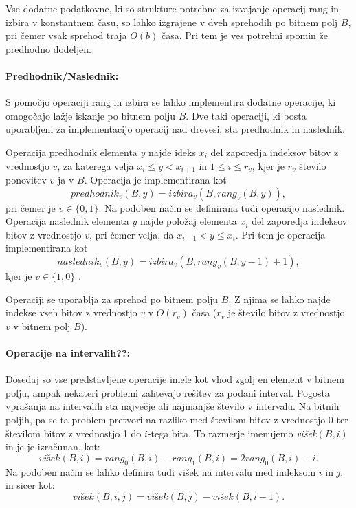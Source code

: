 Vse dodatne podatkovne, ki so strukture potrebne za izvajanje operacij rang in izbira v konstantnem času, so lahko izgrajene v dveh sprehodih po bitnem polj $B$, pri čemer vsak sprehod traja $O(b)$ časa. Pri tem je ves potrebni spomin že predhodno dodeljen.

\paragraph{Predhodnik/Naslednik:}
S pomočjo operaciji rang in izbira se lahko implementira dodatne operacije, ki omogočajo lažje iskanje po bitnem polju $B$. Dve taki operaciji, ki bosta uporabljeni za implementacijo operacij nad drevesi, sta predhodnik in naslednik.

Operacija predhodnik elementa $y$ najde ideks $x_i$ del zaporedja indeksov bitov z vrednostjo $v$, za katerega velja $x_i \le y < x_{i+1}$ in $1\le i\le r_v$, kjer je $r_v$ število ponovitev $v$-ja v $B$. Operacija je implementirana kot
    $$predhodnik_v(B,y)=izbira_v(B,rang_v(B,y)),$$
pri čemer je $v\in \{0,1\}$. Na podoben način se definirana tudi operacijo naslednik. Operacija naslednik elementa $y$ najde položaj elementa $x_i$ del zaporedja indeksov bitov z vrednostjo $v$, pri čemer velja, da $x_{i-1}< y \le x_i$. Pri tem je operacija implementirana kot
    $$naslednik_v(B,y)=izbira_v(B,rang_v(B,y-1)+1),$$
kjer je  $v\in \{1,0\}$ \cite{Navarro2016}.

Operaciji se uporablja za sprehod po bitnem polju $B$. Z njima se lahko najde indekse vseh bitov z vrednostjo $v$ v $O(r_v)$ časa ($r_v$ je število bitov z vrednostjo $v$ v bitnem polj $B$).

\paragraph{Operacije na intervalih??:}
Dosedaj so vse predstavljene operacije imele kot vhod zgolj en element v bitnem polju, ampak nekateri problemi zahtevajo rešitev za podani interval. Pogosta vprašanja na intervalih sta največje ali najmanjše število v intervalu. Na bitnih poljih, pa se ta problem pretvori na razliko med številom bitov z vrednostjo 0 ter številom bitov z vrednostjo 1 do $i$-tega bita. To razmerje imenujemo \textit{višek}$(B,i)$ in je je izračunan, kot:
$$
    \textit{višek}(B,i)=rang_0(B,i)-rang_1(B,i)=2rang_0(B,i)-i.
$$
Na podoben način se lahko definira tudi višek na intervalu med indeksom $i$ in $j$, in sicer kot:
$$
    \textit{višek}(B,i,j)=\textit{višek}(B,j)-\textit{višek}(B,i-1).
$$

